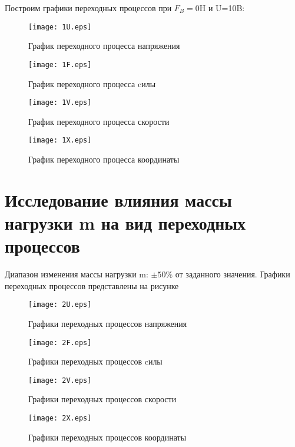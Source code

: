 \documentclass[12pt,a4paper]{article}
\begin{document}
\newpage
Построим графики переходных процессов при $F_B=0$H и U=10B:
\begin{figure}[H]
	\centering
		\centering
		\texttt{[image: 1U.eps]}
		\caption{График переходного процесса напряжения}
\end{figure}
\begin{figure}[H]		
		\centering
		\texttt{[image: 1F.eps]}
		\caption{График переходного процесса cилы}
\end{figure}
\begin{figure}[H]	
		\centering
		\texttt{[image: 1V.eps]}
	    \caption{График переходного процесса скорости}
\end{figure}	
\begin{figure}[H]
		\centering
		\texttt{[image: 1X.eps]}
		\caption{График переходного процесса координаты}
\end{figure}	
	

\newpage
\section{Исследование влияния массы нагрузки m на вид переходных процессов}
Диапазон изменения массы нагрузки m: $\pm 50\%$  от заданного значения. Графики переходных процессов представлены на рисунке \begin{figure}[H]
	\centering
	\centering
	\texttt{[image: 2U.eps]}
	\caption{Графики переходных процессов напряжения}
\end{figure}
\begin{figure}[H]		
	\centering
	\texttt{[image: 2F.eps]}
	\caption{Графики переходных процессов cилы}
\end{figure}
\begin{figure}[H]	
	\centering
	\texttt{[image: 2V.eps]}
	\caption{Графики переходных процессов скорости}
\end{figure}	
\begin{figure}[H]
	\centering
	\texttt{[image: 2X.eps]}
	\caption{Графики переходных процессов координаты}
\end{figure}
\end{document}

